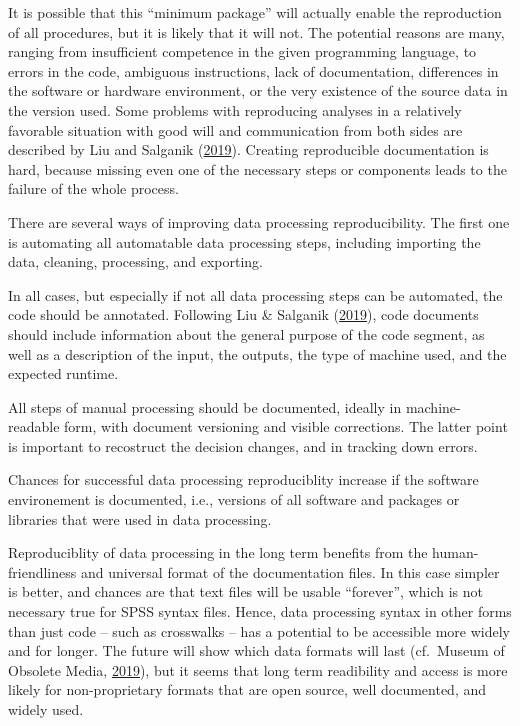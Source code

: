 \documentclass[12pt,]{article}
\begin{document}
It is possible that this ``minimum package'' will actually enable the reproduction of all procedures, but it is likely that it will not. The potential reasons are many, ranging from insufficient competence in the given programming language, to errors in the code, ambiguous instructions, lack of documentation, differences in the software or hardware environment, or the very existence of the source data in the version used. Some problems with reproducing analyses in a relatively favorable situation with good will and communication from both sides are described by Liu and Salganik (\protect\hyperlink{ref-Liu2019}{2019}). Creating reproducible documentation is hard, because missing even one of the necessary steps or components leads to the failure of the whole process.

There are several ways of improving data processing reproducibility. The first one is automating all automatable data processing steps, including importing the data, cleaning, processing, and exporting.

In all cases, but especially if not all data processing steps can be automated, the code should be annotated. Following Liu \& Salganik (\protect\hyperlink{ref-Liu2019}{2019}), code documents should include information about the general purpose of the code segment, as well as a description of the input, the outputs, the type of machine used, and the expected runtime.

All steps of manual processing should be documented, ideally in machine-readable form, with document versioning and visible corrections. The latter point is important to recostruct the decision changes, and in tracking down errors.

Chances for successful data processing reproduciblity increase if the software environement is documented, i.e., versions of all software and packages or libraries that were used in data processing.

Reproduciblity of data processing in the long term benefits from the human-friendliness and universal format of the documentation files. In this case simpler is better, and chances are that text files will be usable ``forever'', which is not necessary true for SPSS syntax files. Hence, data processing syntax in other forms than just code -- such as crosswalks -- has a potential to be accessible more widely and for longer. The future will show which data formats will last (cf.~Museum of Obsolete Media, \protect\hyperlink{ref-MuseumofObsoleteMedia2019}{2019}), but it seems that long term readibility and access is more likely for non-proprietary formats that are open source, well documented, and widely used.
\end{document}
